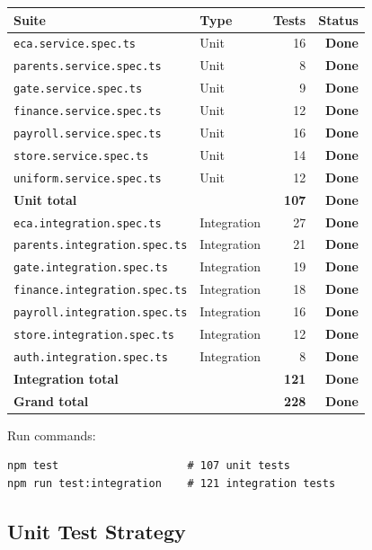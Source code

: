 \documentclass[11pt, a4paper]{article}
\newcommand{\done}{\textcolor{done}{\textbf{Done}}}
\newcommand{\code}[1]{\texttt{\small #1}}
\begin{document}
\begin{center}
\begin{tabular}{@{}llrr@{}}
  \toprule
  Suite & Type & Tests & Status \\
  \midrule
  \code{eca.service.spec.ts}       & Unit        & 16  & \done \\
  \code{parents.service.spec.ts}   & Unit        & 8   & \done \\
  \code{gate.service.spec.ts}      & Unit        & 9   & \done \\
  \code{finance.service.spec.ts}   & Unit        & 12  & \done \\
  \code{payroll.service.spec.ts}   & Unit        & 16  & \done \\
  \code{store.service.spec.ts}     & Unit        & 14  & \done \\
  \code{uniform.service.spec.ts}   & Unit        & 12  & \done \\
  \midrule
  \textbf{Unit total}              &             & \textbf{107} & \done \\
  \midrule
  \code{eca.integration.spec.ts}     & Integration & 27  & \done \\
  \code{parents.integration.spec.ts} & Integration & 21  & \done \\
  \code{gate.integration.spec.ts}    & Integration & 19  & \done \\
  \code{finance.integration.spec.ts} & Integration & 18  & \done \\
  \code{payroll.integration.spec.ts} & Integration & 16  & \done \\
  \code{store.integration.spec.ts}   & Integration & 12  & \done \\
  \code{auth.integration.spec.ts}    & Integration & 8   & \done \\
  \midrule
  \textbf{Integration total}       &             & \textbf{121} & \done \\
  \midrule
  \textbf{Grand total}             &             & \textbf{228} & \textbf{\done} \\
  \bottomrule
\end{tabular}
\end{center}

Run commands:
\begin{lstlisting}
npm test                    # 107 unit tests
npm run test:integration    # 121 integration tests
\end{lstlisting}

\subsection{Unit Test Strategy}
\end{document}
